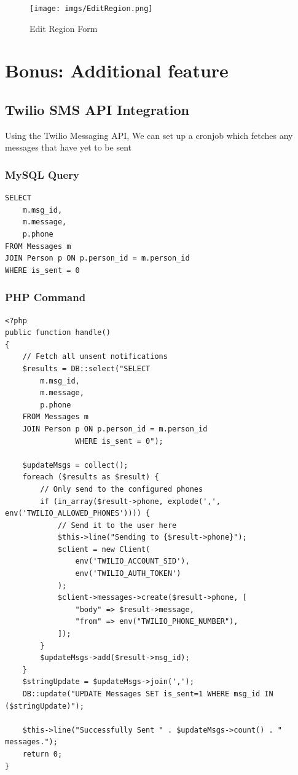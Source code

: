 \documentclass{article}
\begin{document}
\begin{figure}[H]
    \centering
    \texttt{[image: imgs/EditRegion.png]}
    \caption{Edit Region Form}
\end{figure}


\section{Bonus: Additional feature}
\subsection{Twilio SMS API Integration}

Using the Twilio Messaging API, We can set up a cronjob which fetches any messages that have yet to be sent

\subsubsection{MySQL Query}
\begin{verbatim}
SELECT
    m.msg_id,
    m.message,
    p.phone
FROM Messages m
JOIN Person p ON p.person_id = m.person_id
WHERE is_sent = 0
\end{verbatim}

\subsubsection{PHP Command}

\begin{verbatim}
<?php
public function handle()
{
    // Fetch all unsent notifications
    $results = DB::select("SELECT
        m.msg_id,
        m.message,
        p.phone
    FROM Messages m
    JOIN Person p ON p.person_id = m.person_id
                WHERE is_sent = 0");

    $updateMsgs = collect();
    foreach ($results as $result) {
        // Only send to the configured phones
        if (in_array($result->phone, explode(',', env('TWILIO_ALLOWED_PHONES')))) {
            // Send it to the user here
            $this->line("Sending to {$result->phone}");
            $client = new Client(
                env('TWILIO_ACCOUNT_SID'),
                env('TWILIO_AUTH_TOKEN')
            );
            $client->messages->create($result->phone, [
                "body" => $result->message,
                "from" => env("TWILIO_PHONE_NUMBER"),
            ]);
        }
        $updateMsgs->add($result->msg_id);
    }
    $stringUpdate = $updateMsgs->join(',');
    DB::update("UPDATE Messages SET is_sent=1 WHERE msg_id IN ($stringUpdate)");

    $this->line("Successfully Sent " . $updateMsgs->count() . " messages.");
    return 0;
}
\end{verbatim}
\end{document}
